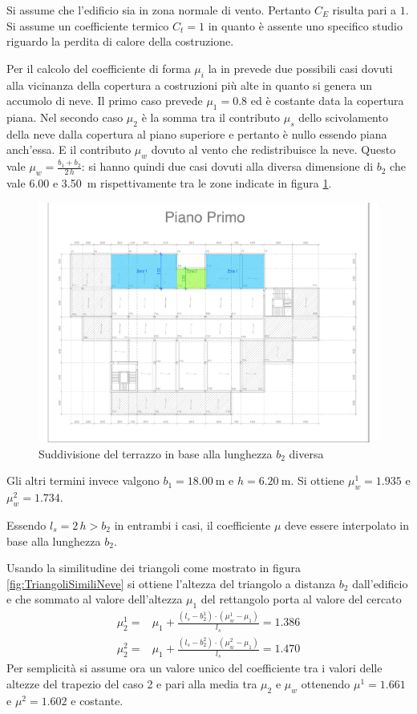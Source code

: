 Si assume che l'edificio sia in zona normale di vento. Pertanto $C_E$ risulta pari a $1$.
Si assume un coefficiente termico $C_t = 1$ in quanto è assente uno specifico studio riguardo la perdita di calore della costruzione. 

Per il calcolo del coefficiente di forma $\mu_i$ la  in  prevede due possibili casi dovuti alla vicinanza della copertura a costruzioni più alte in quanto si genera un accumolo di neve.
Il primo caso prevede $\mu_1=0.8$ ed è costante data la copertura piana. Nel secondo caso $\mu_2$ è la somma tra il contributo $\mu_s$ dello scivolamento della neve dalla copertura al piano superiore e pertanto è nullo essendo piana anch'essa. 
E il contributo $\mu_w$ dovuto al vento che redistribuisce la neve. 
Questo vale $\mu_w=\frac{b_1 + b_2}{2\,h}$: si hanno quindi due casi dovuti alla diversa dimensione di $b_2$ che vale \SI{6.00}{} e \SI{3.50}{\meter} rispettivamente tra le zone indicate in figura \ref{fig:traveZonaAB}.
\begin{figure}[htbp]
\centering
\includegraphics[trim=5.8cm 13cm 9.5cm 4.1cm,clip,frame,width=\textwidth]{IMG/Piante/Piante-AB.pdf} 
\caption{Suddivisione del terrazzo in base alla lunghezza $b_2$ diversa}
\label{fig:traveZonaAB}
\end{figure}
Gli altri termini invece valgono $b_1=\SI{18.00}{\meter}$ e $h=\SI{6.20}{\meter}$. 
Si ottiene $\mu_w^1=1.935$ e $\mu_w^2=1.734$.

Essendo $l_s=2\,h>b_2$ in entrambi i casi, il coefficiente $\mu$ deve essere interpolato in base alla lunghezza $b_2$. 

Usando la similitudine dei triangoli come mostrato in figura \ref{fig:TriangoliSimiliNeve} si ottiene l'altezza del triangolo a distanza $b_2$ dall'edificio e che sommato al valore dell'altezza $\mu_1$ del rettangolo porta al valore del  cercato 
\begin{align*}
	\mu_2^{1}=&\mu_1 + \frac{(l_s - b_2^1)\cdot (\mu_w^1-\mu_1)}{l_s} = 1.386\\
	\mu_2^{2}=&\mu_1 + \frac{(l_s - b_2^2)\cdot (\mu_w^2-\mu_1)}{l_s} =	1.470
\end{align*}
Per semplicità si assume ora un valore unico del coefficiente tra i valori delle altezze del trapezio del caso 2 e pari alla media tra $\mu_2$ e $\mu_w$ ottenendo $\mu^1= 1.661$ e $\mu^2=1.602$ e costante.

